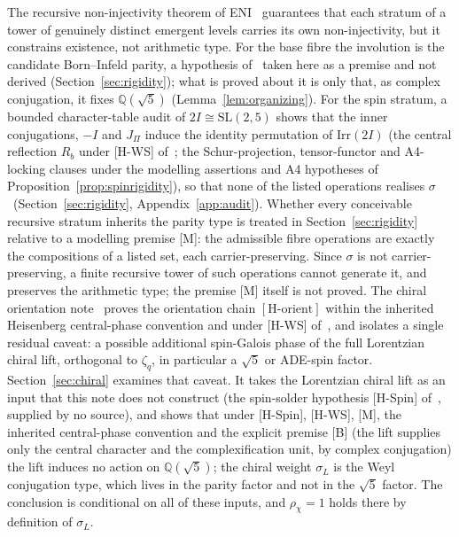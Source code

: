 \documentclass[11pt]{article}
\theoremstyle{definition}
\theoremstyle{remark}
\begin{document}
    The recursive non-injectivity theorem of ENI~\cite{Beau2026l} guarantees that each stratum of a tower of genuinely
    distinct emergent levels carries its own non-injectivity, but it constrains existence, not arithmetic type.
        For the base fibre the involution is the candidate Born--Infeld parity, a hypothesis of~\cite{Beau2026m} taken here
    as a premise and not derived (Section~\ref{sec:rigidity}); what is proved about it is only that, as complex
    conjugation, it fixes $\mathbb{Q}(\sqrt{5})$ (Lemma~\ref{lem:organizing}).
    For the spin stratum, a bounded character-table audit of $2I\cong\mathrm{SL}(2,5)$ shows that the inner
    conjugations, $-I$ and $J_\Pi$ induce the identity permutation of $\mathrm{Irr}(2I)$ (the central reflection $R_b$
    under [H-WS] of~\cite{Beau2026q11of}; the Schur-projection, tensor-functor and A4-locking clauses under the
    modelling assertions and A4 hypotheses of Proposition~\ref{prop:spinrigidity}), so that none of the listed
    operations realises $\sigma$~(Section~\ref{sec:rigidity}, Appendix~\ref{app:audit}).
    Whether every conceivable recursive stratum inherits the parity type is treated in Section~\ref{sec:rigidity}
    relative to a modelling premise [M]: the admissible fibre operations are exactly the compositions of a listed
    set, each carrier-preserving.
    Since $\sigma$ is not carrier-preserving, a finite recursive tower of such operations cannot generate it, and
    preserves the arithmetic type; the premise [M] itself is not proved.
    The chiral orientation note~\cite{Beau2026cho} proves the orientation chain
    $[\mathrm{H\text{-}orient}]$ within the inherited Heisenberg central-phase convention and under [H-WS]
    of~\cite{Beau2026q11of}, and isolates a single residual caveat: a possible additional spin-Galois phase of the
    full Lorentzian chiral lift, orthogonal to $\zeta_q$, in particular a $\sqrt{5}$ or ADE-spin factor.
    Section~\ref{sec:chiral} examines that caveat.
    It takes the Lorentzian chiral lift as an input that this note does not construct (the spin-solder hypothesis
    [H-Spin] of~\cite{Beau2026q14}, supplied by no source), and shows that under [H-Spin], [H-WS], [M], the
    inherited central-phase convention and the explicit premise [B] (the lift supplies only the central character and
    the complexification unit, by complex conjugation) the lift induces no action on $\mathbb{Q}(\sqrt{5})$; the chiral weight
    $\sigma_L$ is the Weyl conjugation type, which lives in the parity factor and not in the $\sqrt{5}$ factor.
    The conclusion is conditional on all of these inputs, and $\rho_\chi=1$ holds there by definition of $\sigma_L$.
\end{document}
